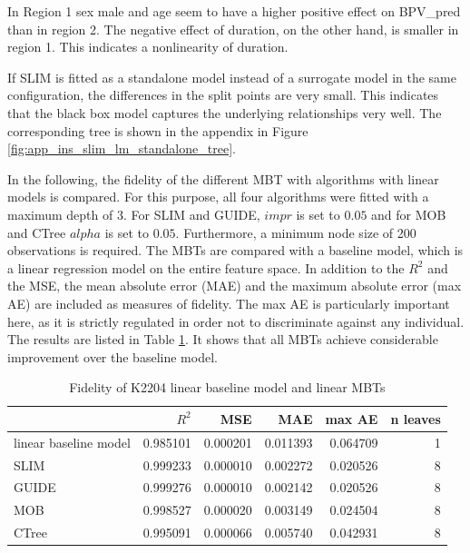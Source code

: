 In Region 1 sex male and age seem to have a higher positive effect on  BPV\_pred than in region 2. The negative effect of duration, on the other hand, is smaller in region 1. This indicates a nonlinearity of duration.

If SLIM is fitted as a standalone model instead of a surrogate model in the same configuration, the differences in the split points are very small. This indicates that the black box model captures the underlying relationships very well. The corresponding tree is shown in the appendix in Figure \ref{fig:app_ins_slim_lm_standalone_tree}.

In the following, the fidelity of the different MBT with algorithms with linear models is compared. For this purpose, all four algorithms were fitted with a maximum depth of 3. For SLIM and GUIDE, $impr$ is set to $0.05$ and for MOB and CTree $alpha$ is set to $0.05$. Furthermore, a minimum node size of 200 observations is required.
The MBTs are compared with a baseline model, which is a linear regression model on the entire feature space. In addition to the $R^2$ and the MSE, the mean absolute error (MAE) and the maximum absolute error (max AE) are included as measures of fidelity. The max AE is particularly important here, as it is strictly regulated in order not to discriminate against any individual. 
The results are listed in Table \ref{tab:ins_k2204_lm_surrogates_perf}. It shows that all MBTs achieve considerable improvement over the baseline model.

\begin{table}[!htb]

\centering \scriptsize
\begin{tabular}[t]{l|r|r|r|r|r}
\hline
  & $R^2$ & MSE & MAE & max AE & n leaves\\
\hline
linear baseline model & 0.985101 & 0.000201 & 0.011393 & 0.064709 & 1\\
\hline
SLIM & 0.999233 & 0.000010 & 0.002272 & 0.020526 & 8\\
GUIDE & 0.999276 & 0.000010 & 0.002142 & 0.020526 & 8\\
MOB & 0.998527 & 0.000020 & 0.003149 & 0.024504 & 8\\
CTree & 0.995091 & 0.000066 & 0.005740 & 0.042931 & 8\\
\hline
\end{tabular}
\caption{Fidelity of K2204 linear baseline model and linear MBTs}
\label{tab:ins_k2204_lm_surrogates_perf}
\end{table}

